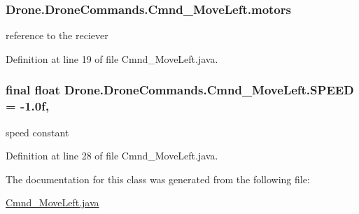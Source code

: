 \subsubsection[{motors}]{ Drone.\+Drone\+Commands.\+Cmnd\+\_\+\+Move\+Left.\+motors\hspace{0.3cm}{\ttfamily [private]}}\label{class_drone_1_1_drone_commands_1_1_cmnd___move_left_a2492b3f8b7d40f172fcde81705d96547}
reference to the reciever 

Definition at line 19 of file Cmnd\+\_\+\+Move\+Left.\+java.

\hypertarget{class_drone_1_1_drone_commands_1_1_cmnd___move_left_a93f5514425060c17227e4f883079bf35}{}
\subsubsection[{S\+P\+E\+E\+D}]{\setlength{\rightskip}{0pt plus 5cm}final float Drone.\+Drone\+Commands.\+Cmnd\+\_\+\+Move\+Left.\+S\+P\+E\+E\+D = -\/1.\+0f\hspace{0.3cm}{\ttfamily [static]}, {\ttfamily [private]}}\label{class_drone_1_1_drone_commands_1_1_cmnd___move_left_a93f5514425060c17227e4f883079bf35}
speed constant 

Definition at line 28 of file Cmnd\+\_\+\+Move\+Left.\+java.



The documentation for this class was generated from the following file\+:\begin{DoxyCompactItemize}
\item 
\hyperlink{_cmnd___move_left_8java}{Cmnd\+\_\+\+Move\+Left.\+java}\end{DoxyCompactItemize}
